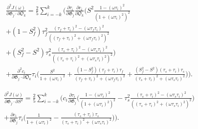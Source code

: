 \documentclass[a4paper,11pt,twoside,openright]{book}
\def\lthtmlcheckvsize{\ifdim\ht\sizebox<\vsize 
  \ifdim\wd\sizebox<\hsize\expandafter\hfill\fi \expandafter\vfill
  \else\expandafter\vss\fi}%
\begin{document}
{\newpage\clearpage
{}%
\begin{multline}
    \frac{\partial^2 J(\omega)}{\partial \mathfrak{G}_j \cdot \partial \mathfrak{O}_k} = \frac{2}{5} \sum_{i=-k}^k \Bigg(
        \frac{\partial \tau_i}{\partial \mathfrak{G}_j} \frac{\partial c_i}{\partial \mathfrak{O}_k} \Bigg(
            S^2 \frac{1 - (\omega \tau_i)^2}{\left(1 + (\omega \tau_i)^2 \right)^2} \\
            + (1 - S^2_f) \tau_f^2 \frac{(\tau_f + \tau_i)^2 - (\omega \tau_f \tau_i)^2}{\left((\tau_f + \tau_i)^2 + (\omega \tau_f \tau_i)^2 \right)^2} \\
            + (S^2_f - S^2) \tau_s^2 \frac{(\tau_s + \tau_i)^2 - (\omega \tau_s \tau_i)^2}{\left((\tau_s + \tau_i)^2 + (\omega \tau_s \tau_i)^2 \right)^2}
        \Bigg) \\
        +  \frac{\partial^2 c_i}{\partial \mathfrak{G}_j \cdot \partial \mathfrak{O}_k} \tau_i \Bigg(
            \frac{S^2}{1 + (\omega \tau_i)^2}
            + \frac{(1 - S^2_f)(\tau_f + \tau_i)\tau_f}{(\tau_f + \tau_i)^2 + (\omega \tau_f \tau_i)^2}
            + \frac{(S^2_f - S^2)(\tau_s + \tau_i)\tau_s}{(\tau_s + \tau_i)^2 + (\omega \tau_s \tau_i)^2}
        \Bigg)
    \Bigg).
\end{multline}%
\lthtmldisplayZ
\lthtmlcheckvsize\clearpage}

{\newpage\clearpage
{}%
\begin{multline}
    \frac{\partial^2 J(\omega)}{\partial \mathfrak{G}_j \cdot \partial S^2} = \frac{2}{5} \sum_{i=-k}^k \Bigg(
        c_i \frac{\partial \tau_i}{\partial \mathfrak{G}_j} \Bigg(
            \frac{1 - (\omega \tau_i)^2}{\left(1 + (\omega \tau_i)^2 \right)^2}
            - \tau_s^2 \frac{(\tau_s + \tau_i)^2 - (\omega \tau_s \tau_i)^2}{\left((\tau_s + \tau_i)^2 + (\omega \tau_s \tau_i)^2 \right)^2}
        \Bigg) \\
        +  \frac{\partial c_i}{\partial \mathfrak{G}_j} \tau_i \Bigg(
            \frac{1}{1 + (\omega \tau_i)^2}
            - \frac{(\tau_s + \tau_i)\tau_s}{(\tau_s + \tau_i)^2 + (\omega \tau_s \tau_i)^2}
        \Bigg)
    \Bigg).
\end{multline}%
\lthtmldisplayZ
\lthtmlcheckvsize\clearpage}
\end{document}
